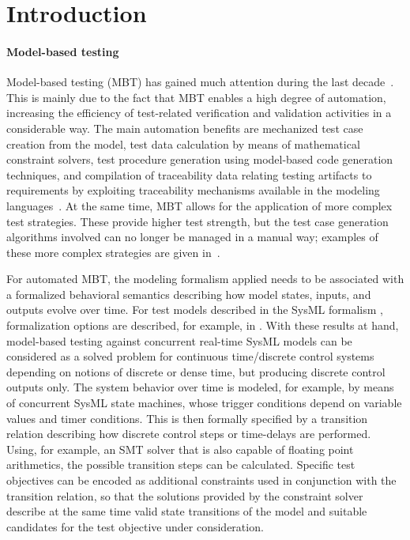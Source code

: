 \section{Introduction}


\paragraph{Model-based testing}
Model-based testing (MBT) has gained much attention during the last 
decade~\cite{utting_taxonomy_2012-2,Petrenko:2012:MTS:2347096.2347101,anand_orchestrated_2013}. This is mainly due to the fact that 
MBT enables a high degree of automation, increasing the efficiency of test-related
verification and validation activities in a considerable way. 
The main automation benefits are mechanized test case creation from the model, 
test data calculation by means of mathematical constraint solvers, test procedure generation using model-based code generation techniques, and compilation of traceability data relating testing artifacts to requirements by exploiting traceability mechanisms available in the modeling languages~\cite{EPTCS111.1}.
At the same time, MBT
allows for the application of more complex test strategies. These provide higher test strength, but the test case generation algorithms involved can no longer be managed in a manual way; examples of these more complex strategies are given 
in~\cite{hierons_testing_2004,petrenko_testing_2014,huang_complete_2014}. 


For automated MBT, 
the modeling formalism applied needs to be associated with a formalized behavioral semantics describing how model states, inputs, and outputs evolve over time.
For test models described in the SysML formalism \cite{SysML15},  formalization options are described, for example, in \cite{EPTCS111.1,hilken_unified_2015}.
With these results at hand, model-based testing against concurrent real-time SysML models 
can be considered as a solved problem for continuous time/discrete control systems depending on notions of discrete or dense time, 
but producing discrete control outputs only. 
The system behavior over time is modeled, for example,
by means of concurrent SysML state machines, whose trigger conditions depend 
on variable values and timer conditions. This is then 
formally specified
by a transition relation describing how discrete control steps or time-delays are performed. Using, for example, an SMT solver that is also capable of floating point arithmetics, the possible transition steps 
can be calculated. Specific test objectives can be encoded as additional constraints
used in conjunction with the transition relation, so that the solutions provided by the
constraint solver describe at the same time valid state transitions of the model and suitable candidates for the test objective under consideration.

